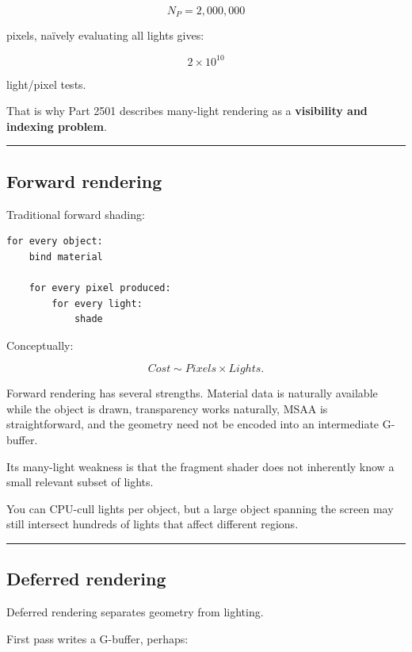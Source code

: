 \[
N_P=2,000,000
\]

pixels, naïvely evaluating all lights gives:

\[
2\times10^{10}
\]

light/pixel tests.

That is why Part 2501 describes many-light rendering as a \textbf{visibility and indexing problem}.

\begin{center}\rule{0.5\linewidth}{0.5pt}\end{center}

\subsection{Forward rendering}\label{04-visual-computing-ii-ch040-forward-rendering}

Traditional forward shading:

\begin{verbatim}
for every object:
    bind material

    for every pixel produced:
        for every light:
            shade
\end{verbatim}

Conceptually:

\[
Cost
\sim
Pixels\times Lights.
\]

Forward rendering has several strengths. Material data is naturally available while the object is drawn, transparency works naturally, MSAA is straightforward, and the geometry need not be encoded into an intermediate G-buffer.

Its many-light weakness is that the fragment shader does not inherently know a small relevant subset of lights.

You can CPU-cull lights per object, but a large object spanning the screen may still intersect hundreds of lights that affect different regions.

\begin{center}\rule{0.5\linewidth}{0.5pt}\end{center}

\subsection{Deferred rendering}\label{04-visual-computing-ii-ch040-deferred-rendering}

Deferred rendering separates geometry from lighting.

First pass writes a G-buffer, perhaps:

